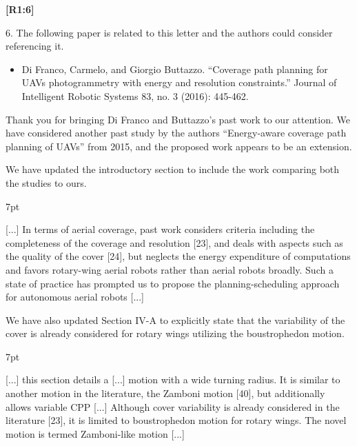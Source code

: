 \documentclass[10pt]{letter}
\newenvironment{formal}{%
  \def\FrameCommand{%
    \hspace{1pt}%
    {\color{red}\vrule width 2pt}%
    {\color{formalshade}\vrule width 4pt}%
    \colorbox{formalshade}%
  }%
  \MakeFramed{\advance\hsize-\width\FrameRestore}%
  \noindent\hspace{-4.55pt}%
  \begin{adjustwidth}{}{7pt}%
  \vspace{2pt}\vspace{2pt}%
}
{%
  \vspace{2pt}\end{adjustwidth}\endMakeFramed%
}
\begin{document}
{\hspace*{-4.5em}\textbf{[R1:6]}\vspace*{-1.9em}}

6. The following paper is related to this letter and the authors could consider referencing it.
\begin{itemize}
  \item Di Franco, Carmelo, and Giorgio Buttazzo. ``Coverage path planning for UAVs photogrammetry with energy and resolution constraints.'' Journal of Intelligent Robotic Systems 83, no. 3 (2016): 445-462.
\end{itemize}

{\color{blue} 

{\hspace*{-4.5em}{[R1:6]}\vspace*{-1.9em}}

Thank you for bringing Di Franco and Buttazzo's past work to our attention. We have considered another past study by the authors ``Energy-aware coverage path planning of UAVs'' from 2015, and the proposed work appears to be an extension. %

We have updated the introductory section to include the work comparing both the studies to ours.

\begin{formal}
  \color{black} [...] {\color{blue}In terms of aerial coverage, past work considers criteria including the completeness of the coverage and resolution [{\color{green}23}], and deals with aspects such as the quality of the cover [{\color{green}24}], but neglects the energy expenditure of computations and favors rotary-wing aerial robots rather than aerial robots broadly.} Such a state of practice has prompted us to propose the planning-scheduling approach for autonomous aerial robots [...]
  \vspace*{1ex}
\end{formal}

We have also updated Section IV-A to explicitly state that the variability of the cover is already considered for rotary wings utilizing the boustrophedon motion.

\begin{formal}
  \color{black} [...] this section details a [...] motion with a wide turning radius. It is similar to another motion in the literature, the Zamboni
  motion [{\color{green}40}], but additionally allows variable CPP [...] {\color{blue} Although cover variability is already considered in the literature [{\color{green}23}], it is limited to boustrophedon motion for rotary wings.} The novel motion is termed Zamboni-like motion [...]
  \vspace*{1ex}
\end{formal}
}
\end{document}
